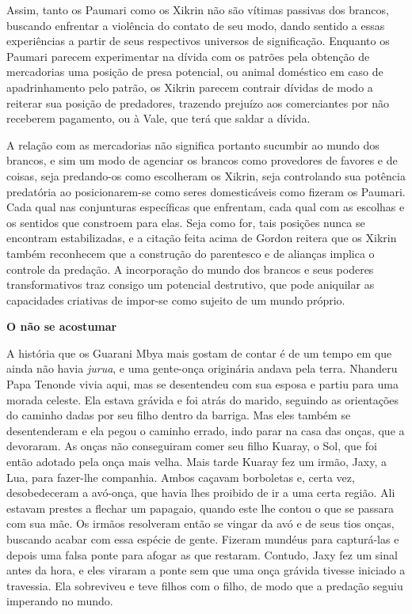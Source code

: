 Assim, tanto os Paumari como os Xikrin não são vítimas passivas dos
brancos, buscando enfrentar a violência do contato de seu modo, dando
sentido a essas experiências a partir de seus respectivos universos de
significação. Enquanto os Paumari parecem experimentar na dívida com os
patrões pela obtenção de mercadorias uma posição de presa potencial, ou
animal doméstico em caso de apadrinhamento pelo patrão, os Xikrin
parecem contrair dívidas de modo a reiterar sua posição de predadores,
trazendo prejuízo aos comerciantes por não receberem pagamento, ou à
Vale, que terá que saldar a dívida.

A relação com as mercadorias não significa portanto sucumbir ao mundo
dos brancos, e sim um modo de agenciar os brancos como provedores de
favores e de coisas, seja predando-os como escolheram os Xikrin, seja
controlando sua potência predatória ao posicionarem-se como seres
domesticáveis como fizeram os Paumari. Cada qual nas conjunturas
específicas que enfrentam, cada qual com as escolhas e os sentidos que
constroem para elas. Seja como for, tais posições nunca se encontram
estabilizadas, e a citação feita acima de Gordon reitera que os Xikrin
também reconhecem que a construção do parentesco e de alianças implica o
controle da predação. A incorporação do mundo dos brancos e seus poderes
transformativos traz consigo um potencial destrutivo, que pode aniquilar
as capacidades criativas de impor-se como sujeito de um mundo próprio.

\textbf{O não se acostumar}

A história que os Guarani Mbya mais gostam de contar é de um tempo em
que ainda não havia \emph{jurua}, e uma gente-onça originária andava
pela terra. Nhanderu Papa Tenonde vivia aqui, mas se desentendeu com sua
esposa e partiu para uma morada celeste. Ela estava grávida e foi atrás
do marido, seguindo as orientações do caminho dadas por seu filho dentro
da barriga. Mas eles também se desentenderam e ela pegou o caminho
errado, indo parar na casa das onças, que a devoraram. As onças não
conseguiram comer seu filho Kuaray, o Sol, que foi então adotado pela
onça mais velha. Mais tarde Kuaray fez um irmão, Jaxy, a Lua, para
fazer-lhe companhia. Ambos caçavam borboletas e, certa vez,
desobedeceram a avó-onça, que havia lhes proibido de ir a uma certa
região. Ali estavam prestes a flechar um papagaio, quando este lhe
contou o que se passara com sua mãe. Os irmãos resolveram então se
vingar da avó e de seus tios onças, buscando acabar com essa espécie de
gente. Fizeram mundéus para capturá-las e depois uma falsa ponte para
afogar as que restaram. Contudo, Jaxy fez um sinal antes da hora, e eles
viraram a ponte sem que uma onça grávida tivesse iniciado a travessia.
Ela sobreviveu e teve filhos com o filho, de modo que a predação seguiu
imperando no mundo.


